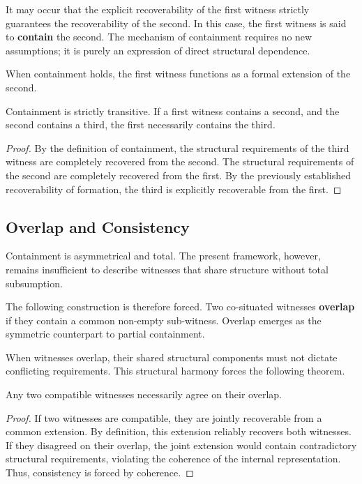 \documentclass[12pt,anyside]{book}
\begin{document}
It may occur that the explicit recoverability of the first witness strictly guarantees the recoverability of the second. In this case, the first witness is said to \textbf{contain} the second. The mechanism of containment requires no new assumptions; it is purely an expression of direct structural dependence.

When containment holds, the first witness functions as a formal extension of the second. 

\begin{theorem}
Containment is strictly transitive. If a first witness contains a second, and the second contains a third, the first necessarily contains the third.
\end{theorem}
\begin{proof}
By the definition of containment, the structural requirements of the third witness are completely recovered from the second. The structural requirements of the second are completely recovered from the first. By the previously established recoverability of formation, the third is explicitly recoverable from the first.
\end{proof}

\subsection{Overlap and Consistency}
Containment is asymmetrical and total. The present framework, however, remains insufficient to describe witnesses that share structure without total subsumption. 

The following construction is therefore forced. Two co-situated witnesses \textbf{overlap} if they contain a common non-empty sub-witness. Overlap emerges as the symmetric counterpart to partial containment. 

When witnesses overlap, their shared structural components must not dictate conflicting requirements. This structural harmony forces the following theorem.

\begin{theorem}
Any two compatible witnesses necessarily agree on their overlap.
\end{theorem}
\begin{proof}
If two witnesses are compatible, they are jointly recoverable from a common extension. By definition, this extension reliably recovers both witnesses. If they disagreed on their overlap, the joint extension would contain contradictory structural requirements, violating the coherence of the internal representation. Thus, consistency is forced by coherence.
\end{proof}
\end{document}
